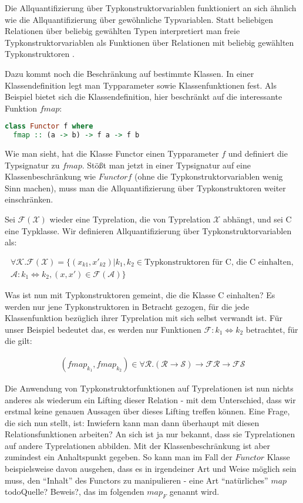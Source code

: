 \documentclass[11pt]{article} %
\begin{document}
Die Allquantifizierung über Typkonstruktorvariablen funktioniert an sich ähnlich wie die Allquantifizierung über gewöhnliche
Typvariablen. Statt beliebigen Relationen über beliebig gewählten Typen interpretiert man freie Typkonstruktorvariablen als
Funktionen über Relationen mit beliebig gewählten Typkonstruktoren \cite{voigtlander}.

Dazu kommt noch die Beschränkung auf bestimmte Klassen. In einer Klassendefinition legt man Typparameter sowie
Klassenfunktionen fest. Als Beispiel bietet sich die Klassendefinition, hier beschränkt auf die interessante Funktion
$fmap$:

\begin{lstlisting}[language=Haskell]
class Functor f where
  fmap :: (a -> b) -> f a -> f b
\end{lstlisting}

Wie man sieht, hat die Klasse Functor einen Typparameter $f$ und definiert die Typsignatur zu $fmap$. Stößt man jetzt in
einer Typsignatur auf eine Klassenbeschränkung wie $Functor f$ (ohne die Typkonstruktorvariablen wenig Sinn machen),
muss man die Allquantifizierung über Typkonstruktoren weiter einschränken.

Sei $\mathcal{F}(\mathcal{X})$ wieder eine Typrelation, die von Typrelation $\mathcal{X}$ abhängt, und sei C eine Typklasse. Wir definieren Allquantifizierung über Typkonstruktorvariablen als:

\begin{align*}
\forall \mathcal{K} . \mathcal{F}(\mathcal{X}) = \{ 
(x_{k1}, x'_{k2}) | k_1, k_2 \in \text{Typkonstruktoren für C, die C einhalten},\\
\mathcal{A} : k_1 \Leftrightarrow k_2, (x, x') \in \mathcal{F}(\mathcal{A})
\}
\end{align*}

Was ist nun mit Typkonstruktoren gemeint, die die Klasse C einhalten? Es werden nur jene Typkonstruktoren in Betracht gezogen,
für die jede Klassenfunktion bezüglich ihrer Typrelation mit sich selbst verwandt ist. Für unser Beispiel bedeutet das, es werden nur
Funktionen $\mathcal{F} : k_1 \Leftrightarrow k_2$ betrachtet, für die gilt:

\begin{align*}
(fmap_{k_1}, fmap_{k_2}) \in \forall \mathcal{R} . (\mathcal{R} \rightarrow \mathcal{S}) \rightarrow \mathcal{F} \mathcal{R}
\rightarrow \mathcal{F} \mathcal{S}
\end{align*}

Die Anwendung von Typkonstruktorfunktionen auf Typrelationen ist nun nichts anderes als wiederum ein Lifting dieser
Relation - mit dem Unterschied, dass wir erstmal keine genauen Aussagen über dieses Lifting treffen können.
Eine Frage, die sich nun stellt, ist: Inwiefern kann man dann überhaupt mit diesen Relationsfunktionen arbeiten? An sich ist ja nur
bekannt, dass sie Typrelationen auf andere Typrelationen abbilden. Mit der Klassenbeschränkung ist aber zumindest ein
Anhaltspunkt gegeben. So kann man im Fall der $Functor$ Klasse beispielsweise davon ausgehen, dass es in irgendeiner
Art und Weise möglich sein muss, den ``Inhalt'' des Functors zu manipulieren - eine Art ``natürliches'' $map$ 
todo{Quelle? Beweis?}, das im folgenden $map_F$ genannt wird.
\end{document}
